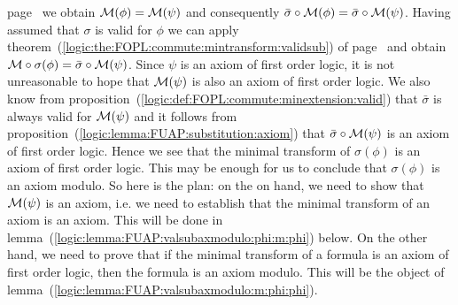 page~\pageref{logic:the:FOPL:mintransfsubcong:kernel} we obtain
${\cal M}(\phi)={\cal M}(\psi)$ and consequently
$\bar{\sigma}\circ{\cal M}(\phi)=\bar{\sigma}\circ{\cal M}(\psi)$.
Having assumed that $\sigma$ is valid for $\phi$ we can apply
theorem~(\ref{logic:the:FOPL:commute:mintransform:validsub}) of
page~\pageref{logic:the:FOPL:commute:mintransform:validsub} and
obtain ${\cal M}\circ\sigma(\phi)=\bar{\sigma}\circ{\cal M}(\psi)$.
Since $\psi$ is an axiom of first order logic, it is not
unreasonable to hope that ${\cal M}(\psi)$ is also an axiom of first
order logic. We also know from
proposition~(\ref{logic:def:FOPL:commute:minextension:valid}) that
$\bar{\sigma}$ is always valid for ${\cal M}(\psi)$ and it follows
from proposition~(\ref{logic:lemma:FUAP:substitution:axiom}) that
$\bar{\sigma}\circ{\cal M}(\psi)$ is an axiom of first order logic.
Hence we see that the minimal transform of $\sigma(\phi)$ is an
axiom of first order logic. This may be enough for us to conclude
that $\sigma(\phi)$ is an axiom modulo. So here is the plan: on the
on hand, we need to show that ${\cal M}(\psi)$ is an axiom, i.e. we
need to establish that the minimal transform of an axiom is an
axiom. This will be done in
lemma~(\ref{logic:lemma:FUAP:valsubaxmodulo:phi:m:phi}) below. On
the other hand, we need to prove that if the minimal transform of a
formula is an axiom of first order logic, then the formula is an
axiom modulo. This will be the object of
lemma~(\ref{logic:lemma:FUAP:valsubaxmodulo:m:phi:phi}).

